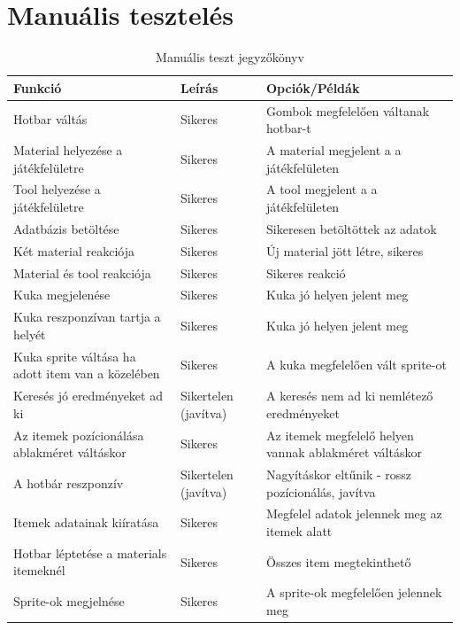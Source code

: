 \documentclass[]{thesis-ekf}
\begin{document}
	\section{Manuális tesztelés}
	\begin{table}[ht!]
		\centering
		\footnotesize
		\begin{tabular}{|>{\centering}m{4.5cm}|>{\centering}m{3cm}|>{\centering\arraybackslash}m{7cm}|}
			\hline
			\textbf{Funkció} & \textbf{Leírás} & \textbf{Opciók/Példák} \\
			\hline
			Hotbar váltás & Sikeres & Gombok megfelelően váltanak hotbar-t \\
			\hline
			Material helyezése a játékfelületre & Sikeres & A material megjelent a a játékfelületen \\
			\hline
			Tool helyezése a játékfelületre & Sikeres & A tool megjelent a a játékfelületen \\
			\hline
			Adatbázis betöltése & Sikeres & Sikeresen betöltöttek az adatok \\
			\hline
			Két material reakciója & Sikeres & Új material jött létre, sikeres \\
			\hline
			Material és tool reakciója & Sikeres & Sikeres reakció \\
			\hline
			Kuka megjelenése & Sikeres & Kuka jó helyen jelent meg \\
			\hline
			Kuka reszponzívan tartja a helyét & Sikeres & Kuka jó helyen jelent meg \\
			\hline
			Kuka sprite váltása ha adott item van a közelében & Sikeres & A kuka megfelelően vált sprite-ot \\
			\hline
			Keresés jó eredményeket ad ki & Sikertelen (javítva) & A keresés nem ad ki nemlétező eredményeket \\
			\hline
			Az itemek pozícionálása ablakméret váltáskor & Sikeres & Az itemek megfelelő helyen vannak ablakméret váltáskor \\
			\hline
			A hotbár reszponzív & Sikertelen (javítva) & Nagyításkor eltűnik - rossz pozícionálás, javítva\\
			\hline
			Itemek adatainak kiíratása & Sikeres & Megfelel adatok jelennek meg az itemek alatt \\
			\hline
			Hotbar léptetése a materials itemeknél & Sikeres & Összes item megtekinthető \\
			\hline
			Sprite-ok megjelnése & Sikeres & A sprite-ok megfelelően jelennek meg \\
			\hline
		\end{tabular}
		\caption{Manuális teszt jegyzőkönyv}
		\label{MTeszt-jegyzokonyv}
	\end{table}
	
\end{document}
